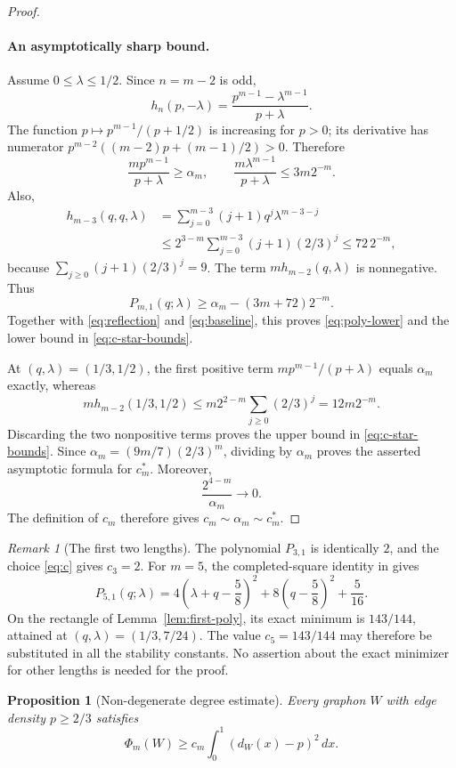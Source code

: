 \documentclass[11pt]{article}
\newtheorem{proposition}[lemma]{Proposition}
\theoremstyle{remark}
\newtheorem{remark}[lemma]{Remark}
\begin{document}
\begin{proof}
\paragraph{An asymptotically sharp bound.}
Assume $0\leq\lambda\leq1/2$. Since $n=m-2$ is odd,
\[
 h_n(p,-\lambda)
 =\frac{p^{m-1}-\lambda^{m-1}}{p+\lambda}.
\]
The function $p\mapsto p^{m-1}/(p+1/2)$ is increasing for $p>0$;
its derivative has numerator
$p^{m-2}((m-2)p+(m-1)/2)>0$.
Therefore
\[
 \frac{mp^{m-1}}{p+\lambda}\geq\alpha_m,
 \qquad
 \frac{m\lambda^{m-1}}{p+\lambda}\leq3m2^{-m}.
\]
Also,
\begin{align*}
 h_{m-3}(q,q,\lambda)
 &=\sum_{j=0}^{m-3}(j+1)q^j\lambda^{m-3-j}\\
 &\leq2^{3-m}\sum_{j=0}^{m-3}(j+1)(2/3)^j
 \leq72\,2^{-m},
\end{align*}
because $\sum_{j\geq0}(j+1)(2/3)^j=9$.
The term $m h_{m-2}(q,\lambda)$ is nonnegative. Thus
\[
 P_{m,1}(q;\lambda)
 \geq\alpha_m-(3m+72)2^{-m}.
\]
Together with \eqref{eq:reflection} and \eqref{eq:baseline}, this proves
\eqref{eq:poly-lower} and the lower bound in \eqref{eq:c-star-bounds}.

At $(q,\lambda)=(1/3,1/2)$, the first positive term
$mp^{m-1}/(p+\lambda)$ equals $\alpha_m$ exactly, whereas
\[
 m h_{m-2}(1/3,1/2)
 \leq m2^{2-m}\sum_{j\geq0}(2/3)^j
 =12m2^{-m}.
\]
Discarding the two nonpositive terms proves the upper bound in
\eqref{eq:c-star-bounds}. Since $\alpha_m=(9m/7)(2/3)^m$,
dividing by $\alpha_m$ proves the asserted asymptotic formula for
$c_m^*$. Moreover,
\[
 \frac{2^{4-m}}{\alpha_m}\longrightarrow0.
\]
The definition of $c_m$ therefore gives $c_m\sim\alpha_m\sim c_m^*$.

\end{proof}

\begin{remark}[The first two lengths]
The polynomial $P_{3,1}$ is identically $2$, and the choice
\eqref{eq:c} gives $c_3=2$.
For $m=5$, the completed-square identity in
\cite[Section~4]{dense} gives
\[
 P_{5,1}(q;\lambda)
 =4\left(\lambda+q-\frac58\right)^2
  +8\left(q-\frac58\right)^2+\frac5{16}.
\]
On the rectangle of Lemma~\ref{lem:first-poly}, its exact minimum is
$143/144$, attained at $(q,\lambda)=(1/3,7/24)$.
The value $c_5=143/144$ may therefore be substituted in all the
stability constants. No assertion about the exact minimizer for
other lengths is needed for the proof.
\end{remark}

\begin{proposition}[Non-degenerate degree estimate]\label{prop:degree}
Every graphon $W$ with edge density $p\geq2/3$ satisfies
\begin{equation}\label{eq:degree-coercivity}
 \Phi_m(W)\geq c_m\int_0^1(d_W(x)-p)^2\,dx.
\end{equation}
\end{proposition}
\end{document}
